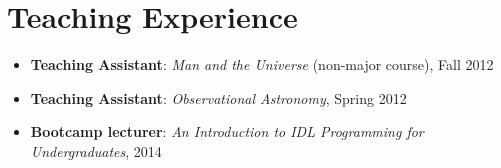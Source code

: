 \documentclass[11pt,letterpaper,roman]{moderncv}        %
\begin{document}
\begin{itemize}
\end{itemize}

\section{Teaching Experience}
\begin{itemize}
\setlength\itemsep{0.0em}
\item {\bfseries Teaching Assistant}: \textit{Man and the Universe} (non-major course), Fall 2012 %
\item {\bfseries Teaching Assistant}: \textit{Observational Astronomy}, Spring 2012 %
\item {\bfseries Bootcamp lecturer}: \textit{An Introduction to IDL Programming for Undergraduates}, 2014 %
\end{itemize}
\end{document}
